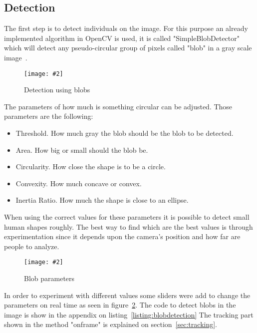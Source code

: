 \documentclass[hidelinks,11pt,a4paper,oneside,article]{memoir}
\newcommand{\putimage}[3][10] %
{
\begin{figure}[h]
    \centering
    \captionsetup{justification=centering}
    \texttt{[image: \#2]}
    \caption{#3}
    \label{fig:#2}
\end{figure}
}
\begin{document}
\subsection{Detection}
The first step is to detect individuals on the image. For this purpose an already implemented algorithm in OpenCV is used, it is called "SimpleBlobDetector" which will detect any pseudo-circular group of pixels called "blob" in a gray scale image~\cite{satyaBlob}.

\putimage{analysed}{Detection using blobs}

The parameters of how much is something circular can be adjusted. Those parameters are the following:
\begin{itemize}
    \item Threshold. How much gray the blob should be the blob to be detected.
    \item Area. How big or small should the blob be.
    \item Circularity. How close the shape is to be a circle.
    \item Convexity. How much concave or convex.
    \item Inertia Ratio. How much the shape is close to an ellipse.
\end{itemize}

When using the correct values for these parameters it is possible to detect small human shapes roughly. The best way to find which are the best values is through experimentation since it depends upon the camera's position and how far are people to analyze.

\putimage[10]{analysis-control}{Blob parameters}

In order to experiment with different values some sliders were add to change the parameters on real time as seen in figure~\ref{fig:analysis-control}. The code to detect blobs in the image is show in the appendix on listing~\ref{listing:blobdetection} The tracking part shown in the method "onframe" is explained on section~\ref{sec:tracking}.
\end{document}

